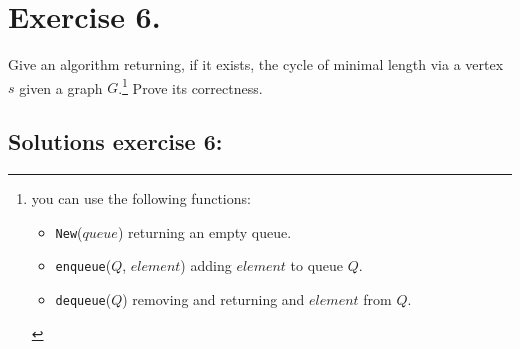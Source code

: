 \documentclass{article}
\begin{document}
\newpage
\section*{Exercise 6.}
Give an algorithm returning, if it exists, the cycle of minimal length via a vertex $s$ given a graph $G$.\footnote{you can use the following functions: \begin{itemize} \item \texttt{New}($queue$) returning an empty queue. \item \texttt{enqueue}($Q$, $element$) adding $element$ to queue $Q$. \item \texttt{dequeue}($Q$) removing and returning and $element$ from $Q$.  \end{itemize}} Prove its correctness.

\subsection*{Solutions exercise 6:}
\end{document}
